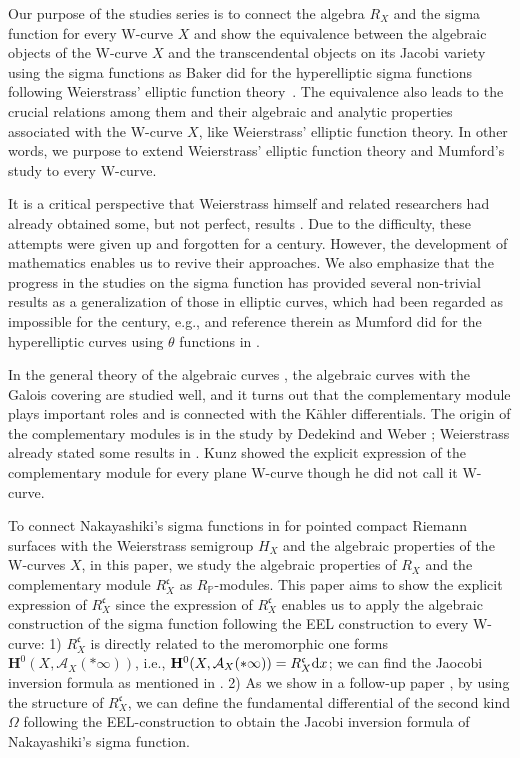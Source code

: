 \documentclass[10pt,a4paper]{amsart}
\def\PP{{\mathbb P}}
\def\bH{{\mathbf F}}
\def\bH{{\mathbf H}}
\def\cA{{\mathcal A}}
\def\fc{{\mathfrak c}}
\numberwithin{equation}{section}
\begin{document}
Our purpose of the studies series is to connect the algebra $R_X$ and the sigma function for every W-curve $X$ and show the equivalence between the algebraic objects of the W-curve $X$ and the transcendental objects on its Jacobi variety using the sigma functions as Baker did for the hyperelliptic sigma functions following Weierstrass' elliptic function theory~\cite{Baker97}.
The equivalence also leads to the crucial relations among them and their algebraic and analytic properties associated with the W-curve $X$, like Weierstrass' elliptic function theory.
In other words, we purpose to extend Weierstrass' elliptic function theory \cite{WeiWV} and Mumford's study \cite{Mum81,Mum84} to every W-curve.

It is a critical perspective that Weierstrass himself and related researchers had already obtained some, but not perfect, results \cite{Baker97,WeiWIV}.
Due to the difficulty, these attempts were given up and forgotten for a century.
However, the development of mathematics enables us to revive their approaches.
We also emphasize that the progress in the studies on the sigma function has provided several non-trivial results as a generalization of those in elliptic curves, which had been regarded as impossible for the century, e.g., \cite{BEL20,EEMOP07,EEMOP08, EEL00,FKMPA,MP08,MP14, Nak10b, Onishi18} and reference therein as Mumford did for the hyperelliptic curves using $\theta$ functions in \cite{Mum81,Mum84}.

In the general theory of the algebraic curves \cite{DedekindWeber,Kunz2004,Stichtenoth}, the algebraic curves with the Galois covering are studied well, and it turns out that the complementary module plays important roles and is connected with the K\"ahler differentials.
The origin of the complementary modules is in the study by Dedekind and Weber \cite{DedekindWeber}; Weierstrass already stated some results in \cite{WeiWIV}.
Kunz showed the explicit expression of the complementary module for every plane W-curve \cite[Theorem 15.1]{Kunz2004} though he did not call it W-curve.


To connect Nakayashiki's sigma functions in \cite{Nak16} for pointed compact Riemann surfaces with the Weierstrass semigroup $H_X$ and the algebraic properties of the W-curves $X$, in this paper, we study the algebraic properties of $R_X$ and the complementary module $R_X^\fc$ as $R_\PP$-modules.
This paper aims to show the explicit expression of $R_X^\fc$ since the expression of $R_X^\fc$ enables us to apply the algebraic construction of the sigma function following the EEL construction to every W-curve:
1) $R_X^\fc$ is directly related to the meromorphic one forms $\bH^0(X, \cA_X(*\infty))$, i.e., $\bH^0(X, \cA_X(*\infty))=R_X^\fc {\rm d} x$; we can find the Jaocobi inversion formula as mentioned in \cite{KM2020}.
2) As we show in a follow-up paper \cite{KMP2022b}, by using the structure of $R_X^\fc$, we can define the fundamental differential of the second kind $\Omega$ following the EEL-construction to obtain the Jacobi inversion formula of Nakayashiki's sigma function.
\end{document}
